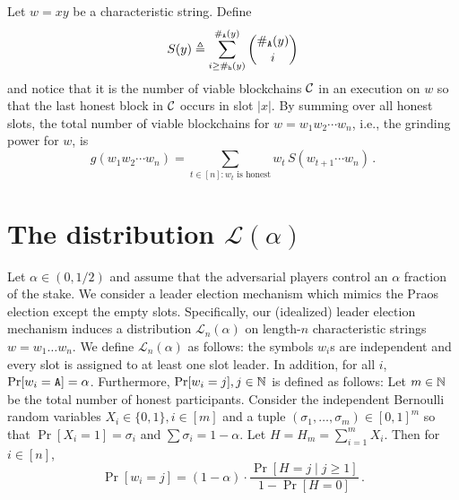 Let $w = xy$ be a characteristic string. 
Define
\begin{equation}\label{eq:S_y}
    S(y) 
    \triangleq \sum_{i \geq \#_{\mathtt{h}}(y)}^{\#_{\mathtt{A}}(y)}{ \binom{\#_{\mathtt{A}}(y)}{i} } 
\end{equation}
and notice that it is the number of viable blockchains $\mathcal{C}$
in an execution on $w$ 
so that the last honest block in $\mathcal{C}$ occurs in slot $|x|$. 
By summing over all honest slots, 
the total number of viable blockchains for $w = w_1 w_2 \cdots w_n$,
i.e., the grinding power for $w$, is 
\begin{equation}\label{eq:g_praos}
    g(w_1 w_2 \cdots w_n) 
    = \sum_{ \text{$t \in [n] : w_t$ is honest} }
      w_t\, S(w_{t+1} \cdots w_n)
    \,.  
\end{equation}





\section{The distribution $\mathcal{L}(\alpha)$}
Let $\alpha \in (0, 1/2)$ 
and assume that the adversarial players control an $\alpha$ 
fraction of the stake. 
We consider a leader election mechanism 
which mimics the Praos election except the empty slots. 
Specifically, 
our (idealized) leader election mechanism 
induces 
a distribution $\mathcal{L}_n(\alpha)$ 
on length-$n$ characteristic strings $w = w_1 \ldots w_n$. 
We define $\mathcal{L}_n(\alpha)$ as follows: 
the symbols $w_i$s are independent 
and 
every slot is assigned to at least one slot leader. 
In addition, for all $i$, $\Pr[w_i = \mathtt{A}] = \alpha$.
Furthermore, $\Pr[w_i = j], j \in \mathbb{N}$ is defined as follows: 
Let $m \in \mathbb{N}$ be the total number of honest participants. 
Consider the independent Bernoulli random variables $X_i \in \{0, 1\}, i \in [m]$ 
and a tuple $(\sigma_1, \ldots, \sigma_m) \in [0,1]^m$ 
so that $\Pr[X_i = 1] = \sigma_i$ 
and $\sum \sigma_i = 1 - \alpha$. 
Let $H = H_m = \sum_{i =1}^m X_i$. 
Then for $i \in [n]$, 
$$
  \Pr[w_i = j] = (1-\alpha)\cdot
    \frac{\Pr[H = j \mid j \geq 1]}{1 - \Pr[H = 0]}
    \,.
$$

